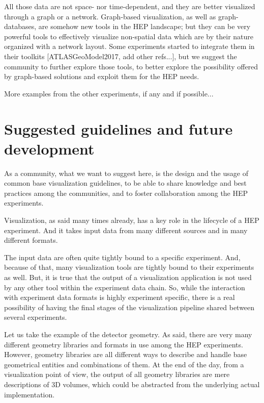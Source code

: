 \documentclass[12pt,a4paper]{article}
\begin{document}
All those data are not space- nor time-dependent, and they are better visualized through a graph or a network. Graph-based visualization,
as well as graph-databases, are somehow new tools in the HEP landscape; but they can be very powerful tools to effectively visualize
non-spatial data which are by their nature organized with a network layout. Some experiments started to integrate them in their
toolkits [ATLASGeoModel2017, add other refs...], but we suggest the community to further explore those tools, to better explore the
possibility offered by graph-based solutions and exploit them for the HEP needs.

More examples from the other experiments, if any and if possible...

\hypertarget{suggested-guidelines}{%
\section{Suggested guidelines and future development}\label{suggested-guidelines}}

As a community, what we want to suggest here, is the design and the usage of common base visualization guidelines, to be able to share
knowledge and best practices among the communities, and to foster collaboration among the HEP experiments.

Visualization, as said many times already, has a key role in the lifecycle of a HEP experiment. And it takes input data from many
different sources and in many different formats.

The input data are often quite tightly bound to a specific experiment. And, because of that, many visualization tools are tightly
bound to their experiments as well. But, it is true that the output of a visualization application is not used by any other tool
within the experiment data chain. So, while the interaction with experiment data formats is highly experiment specific, there is a real possibility of having the final stages of the visualization pipeline shared between several experiments.

Let us take the example of the detector geometry. As said, there are very many different geometry libraries and formats in
use among the HEP experiments. However, geometry libraries are all different ways to describe and handle base geometrical
entities and combinations of them. At the end of the day, from a visualization point of view, the output of all geometry
libraries are mere descriptions of 3D volumes, which  could be abstracted from the underlying actual implementation.
\end{document}
